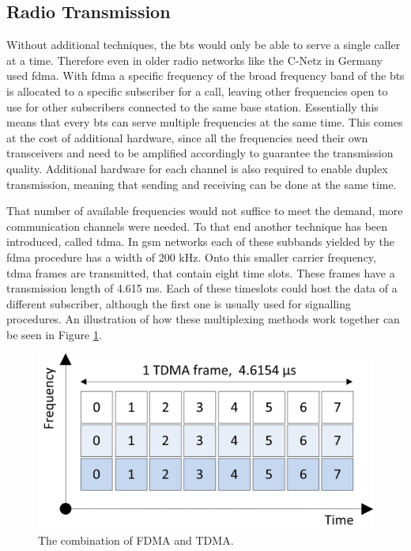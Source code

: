 \subsection{Radio Transmission}
\label{sec:radio}

Without additional techniques, the \gls{bts} would only be able to serve a single caller at a time. 
Therefore even in older radio networks like the C-Netz in Germany used \gls{fdma}.
With \gls{fdma} a specific frequency of the broad frequency band of the \gls{bts} is allocated to a specific subscriber for a call, leaving other frequencies open to use for other subscribers connected to the same base station.
Essentially this means that every \gls{bts} can serve multiple frequencies at the same time.
This comes at the cost of additional hardware, since all the frequencies need their own transceivers and need to be amplified accordingly to guarantee the transmission quality.
Additional hardware for each channel is also required to enable duplex transmission, meaning that sending and receiving can be done at the same time.

That number of available frequencies would not suffice to meet the demand, more communication channels were needed.
To that end another technique has been introduced, called \gls{tdma}.
In \gls{gsm} networks each of these subbands yielded by the \gls{fdma} procedure has a width of 200 kHz.
Onto this smaller carrier frequency, \gls{tdma} frames are transmitted, that contain eight time slots.
These frames have a transmission length of 4.615 ms.
Each of these timeslots could host the data of a different subscriber, although the first one is usually used for signalling procedures.
An illustration of how these multiplexing methods work together can be seen in Figure \ref{fig:fdma_tdma}.

\begin{figure}
	\centering
	\includegraphics{../Images/TDMAFDMA}
	\caption{The combination of FDMA and TDMA.}
	\label{fig:fdma_tdma}
\end{figure}

